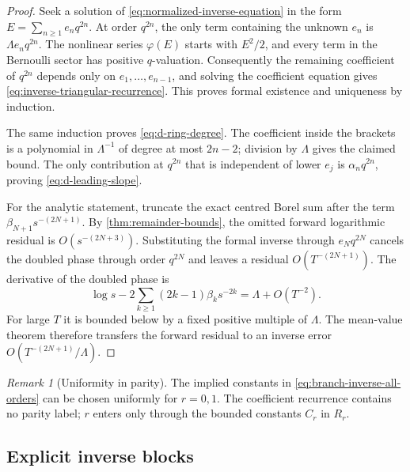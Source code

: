\documentclass[11pt,a4paper,oneside]{article}
\theoremstyle{plain}
\theoremstyle{definition}
\theoremstyle{remark}
\newtheorem{remark}[theorem]{Remark}
\begin{document}
\begin{proof}
Seek a solution of \cref{eq:normalized-inverse-equation} in the form
$E=\sum_{n\ge1}e_nq^{2n}$.  At order $q^{2n}$, the only term containing the
unknown $e_n$ is $\Lambda e_nq^{2n}$.  The nonlinear series $\varphi(E)$
starts with $E^2/2$, and every term in the Bernoulli sector has positive
$q$-valuation.  Consequently the remaining coefficient of $q^{2n}$ depends
only on $e_1,\ldots,e_{n-1}$, and solving the coefficient equation gives
\cref{eq:inverse-triangular-recurrence}.  This proves formal existence and
uniqueness by induction.

The same induction proves \cref{eq:d-ring-degree}.  The coefficient inside the
brackets is a polynomial in $\Lambda^{-1}$ of degree at most $2n-2$; division
by $\Lambda$ gives the claimed bound.  The only contribution at $q^{2n}$ that
is independent of lower $e_j$ is $\alpha_nq^{2n}$, proving
\cref{eq:d-leading-slope}.

For the analytic statement, truncate the exact centred Borel sum after the
term $\beta_{N+1}s^{-(2N+1)}$.  By \cref{thm:remainder-bounds}, the omitted
forward logarithmic residual is $O(s^{-(2N+3)})$.  Substituting the formal
inverse through $e_Nq^{2N}$ cancels the doubled phase through order $q^{2N}$
and leaves a residual $O(T^{-(2N+1)})$.  The derivative of the doubled phase
is
\begin{equation}
 \log s-2\sum_{k\ge1}(2k-1)\beta_ks^{-2k}
 =\Lambda+O(T^{-2}).
 \label{eq:doubled-phase-slope}
\end{equation}
For large $T$ it is bounded below by a fixed positive multiple of $\Lambda$.
The mean-value theorem therefore transfers the forward residual to an inverse
error $O(T^{-(2N+1)}/\Lambda)$.
\end{proof}

\begin{remark}[Uniformity in parity]
The implied constants in \cref{eq:branch-inverse-all-orders} can be chosen
uniformly for $r=0,1$.  The coefficient recurrence contains no parity label;
$r$ enters only through the bounded constants $C_r$ in $R_r$.
\end{remark}

\subsection{Explicit inverse blocks}
\end{document}
